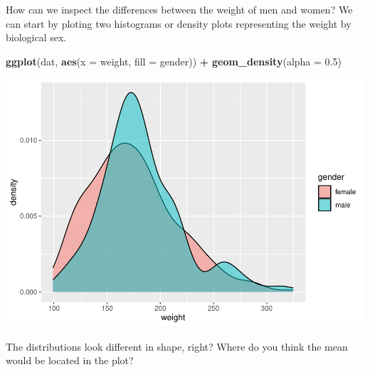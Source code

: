 \documentclass[
]{book}
\newenvironment{Shaded}{\begin{snugshade}}{\end{snugshade}}
\newcommand{\AttributeTok}[1]{\textcolor[rgb]{0.13,0.29,0.53}{#1}}
\newcommand{\CommentTok}[1]{\textcolor[rgb]{0.56,0.35,0.01}{\textit{#1}}}
\newcommand{\ConstantTok}[1]{\textcolor[rgb]{0.56,0.35,0.01}{#1}}
\newcommand{\FloatTok}[1]{\textcolor[rgb]{0.00,0.00,0.81}{#1}}
\newcommand{\FunctionTok}[1]{\textcolor[rgb]{0.13,0.29,0.53}{\textbf{#1}}}
\newcommand{\NormalTok}[1]{#1}
\newcommand{\OtherTok}[1]{\textcolor[rgb]{0.56,0.35,0.01}{#1}}
\newcommand{\SpecialCharTok}[1]{\textcolor[rgb]{0.81,0.36,0.00}{\textbf{#1}}}
\newcommand{\StringTok}[1]{\textcolor[rgb]{0.31,0.60,0.02}{#1}}
\begin{document}
How can we inspect the differences between the weight of men and women? We can start by ploting two histograms or density plots representing the weight by biological sex.

\begin{Shaded}
\begin{Highlighting}[]
\FunctionTok{ggplot}\NormalTok{(dat,}
       \FunctionTok{aes}\NormalTok{(}\AttributeTok{x =}\NormalTok{ weight, }
           \AttributeTok{fill =}\NormalTok{ gender)) }\SpecialCharTok{+}
  \FunctionTok{geom\_density}\NormalTok{(}\AttributeTok{alpha =} \FloatTok{0.5}\NormalTok{)}
\end{Highlighting}
\end{Shaded}

\includegraphics{_main_files/figure-latex/unnamed-chunk-118-1.pdf}

The distributions look different in shape, right? Where do you think the mean would be located in the plot?

\begin{Shaded}
\end{Shaded}
\end{document}
